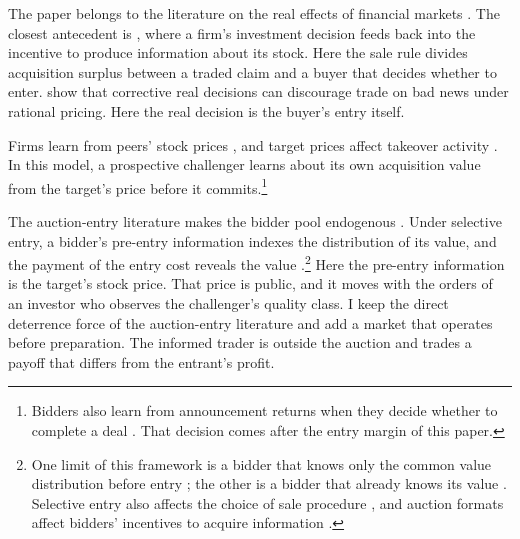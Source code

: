 The paper belongs to the literature on the real effects of financial markets \citep{BondEdmansGoldstein2012}.
The closest antecedent is \citet{DowGoldsteinGuembel2017}, where a firm's investment decision feeds back into
the incentive to produce information about its stock. Here the sale rule divides acquisition surplus between a
traded claim and a buyer that decides whether to enter. \citet{EdmansGoldsteinJiang2015} show that corrective
real decisions can discourage trade on bad news under rational pricing. Here the real decision is the buyer's
entry itself.

Firms learn from peers' stock prices \citep{FoucaultFresard2014}, and target prices affect takeover activity
\citep{EdmansGoldsteinJiang2012}. In this model, a prospective challenger learns about its own acquisition value
from the target's price before it commits.\footnote{Bidders also learn from announcement returns when they decide
whether to complete a deal \citep{Luo2005}. That decision comes after the entry margin of this paper.}

The auction-entry literature makes the bidder pool endogenous
\citep{Samuelson1985,McAfeeMcMillan1987,LevinSmith1994,GentryStroup2019}. Under selective entry, a bidder's
pre-entry information indexes the distribution of its value, and the payment of the entry cost reveals the value
\citep{RobertsSweeting2013}.\footnote{One limit of this framework is a bidder that knows only the common value
distribution before entry \citep{LevinSmith1994}; the other is a bidder that already knows its value
\citep{Samuelson1985}. Selective entry also affects the choice of sale procedure \citep{RobertsSweeting2013}, and
auction formats affect bidders' incentives to acquire information \citep{Persico2000}.} Here the pre-entry
information is the target's stock price. That price is public, and it moves with the orders of an investor who
observes the challenger's quality class. I keep the direct deterrence force of the auction-entry literature and add a
market that operates before preparation. The informed trader is outside the auction and trades a payoff that differs
from the entrant's profit.

